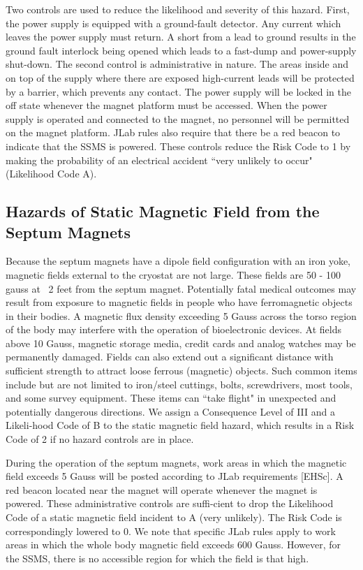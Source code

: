 {Two controls are used to reduce the likelihood and severity of this hazard.  First, the power supply is equipped 
with a ground-fault detector.  Any current which leaves the power supply must return.  A short from a lead to 
ground results in the ground fault interlock being opened which leads to a fast-dump and power-supply shut-down.  
The second control is administrative in nature.  The areas inside and on top of the supply where there are exposed 
high-current leads will be protected by a barrier, which prevents any contact.  The power supply will be locked in 
the off state whenever the magnet platform must be accessed.  When the power supply is operated and connected to 
the magnet, no personnel will be permitted on the magnet platform. JLab rules also require that there be a red 
beacon to indicate that the SSMS is powered.  These controls reduce the Risk Code to 1 by making the probability 
of an electrical accident ``very unlikely to occur" (Likelihood Code A).

\begin{safetyen}{10}{15}
\subsection {\bf Hazards of Static Magnetic Field from the Septum Magnets}
\end{safetyen}

Because the septum magnets have a dipole field configuration with an iron yoke, magnetic fields external to the 
cryostat are not large. These fields are 50 - 100 gauss 
at ~2 feet from the septum magnet. Potentially fatal medical outcomes may result from exposure to magnetic 
fields in people who have ferromagnetic objects in their bodies.  A magnetic flux density exceeding 5 Gauss 
across the torso region of the body may interfere with the operation of bioelectronic devices.  At fields 
above 10 Gauss, magnetic storage media, credit cards and analog watches may be permanently damaged.  Fields 
can also extend out a significant distance with sufficient strength to attract loose ferrous (magnetic) objects. 
Such common items include but are not limited to iron/steel cuttings, bolts, screwdrivers, most tools, and 
some survey equipment.  These items can ``take flight" in unexpected and potentially dangerous directions.  
We assign a Consequence Level of III and a Likeli-hood Code of B to the static magnetic field hazard, which 
results in a Risk Code of 2 if no hazard controls are in place.

During the operation of the septum magnets, work areas in which the magnetic field exceeds 5 Gauss will be 
posted according to JLab requirements [EHSc]. A red beacon located near the magnet will operate whenever 
the magnet is powered.  These administrative controls are suffi-cient to drop the Likelihood Code of a static 
magnetic field incident to A (very unlikely).  The Risk Code is correspondingly lowered to 0.  We note that
 specific JLab rules apply to work areas in which the whole body magnetic field exceeds 600 Gauss. However, 
for the SSMS, there is no accessible region for which the field is that high.

}
